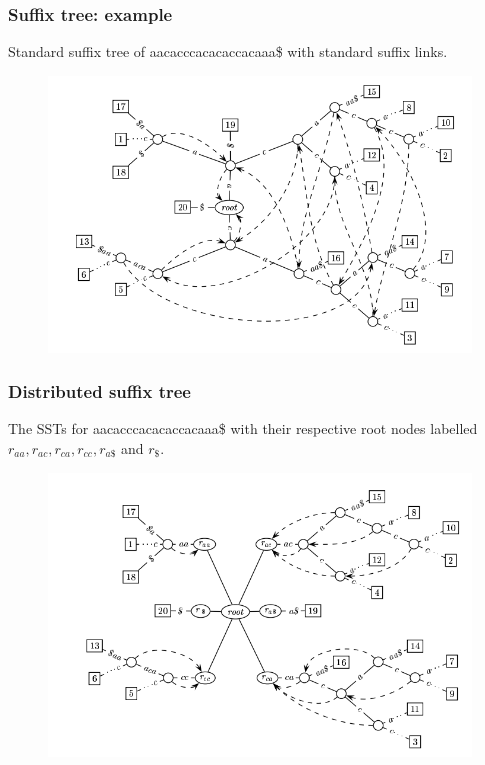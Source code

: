 \documentclass{beamer}
\begin{document}
\begin{frame}
  \frametitle{Suffix tree: example}
  \begin{block}{}
  Standard suffix tree of aacacccacacaccacaaa\$ with standard suffix links.
\end{block}
  \begin{figure}
    \includegraphics[scale=0.4]{dst1.png}
  \end{figure}
\end{frame}
\begin{frame}
  \frametitle{Distributed suffix tree}
  \begin{block}{}
  The SSTs for aacacccacacaccacaaa\$ with their respective root nodes labelled $r_{aa}, r_{ac}, r_{ca}, r_{cc}, r_{a\$}$ and $r_{\$}$.
\end{block}
\begin{figure} 
\includegraphics[scale=0.36]{dst2.png}
\end{figure}
\end{frame}
\end{document}
